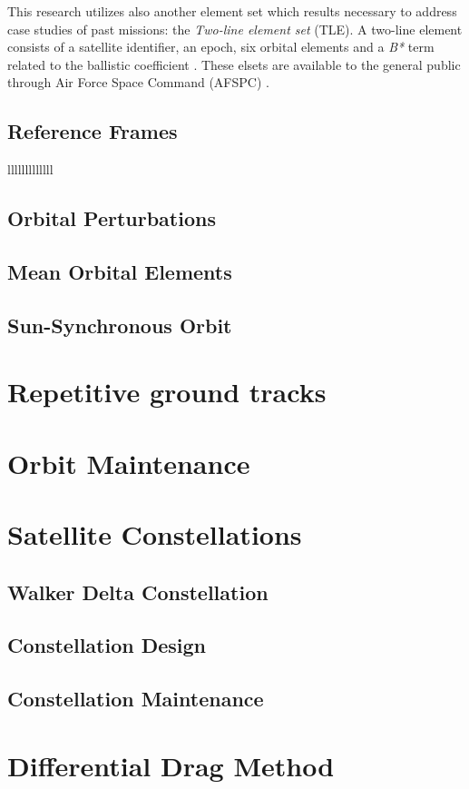 This research utilizes also another element set which results necessary to address case studies of past missions: the \textit{Two-line element set} (TLE). 
A two-line element consists of a satellite identifier, an epoch, six orbital elements and a \textit{B*} term related to the ballistic coefficient \cite{riesing2015orbit}.
These elsets are available to the general public through Air Force Space Command (AFSPC) \cite{vallado2013fundamentals}.

\subsection{Reference Frames}

lllllllllllll

\subsection{Orbital Perturbations}
\subsection{Mean Orbital Elements}
\subsection{Sun-Synchronous Orbit}



\section{Repetitive ground tracks}


\section{Orbit Maintenance}


\section{Satellite Constellations}
\subsection{Walker Delta Constellation}
\subsection{Constellation Design}
\subsection{Constellation Maintenance}


\section{Differential Drag Method}


